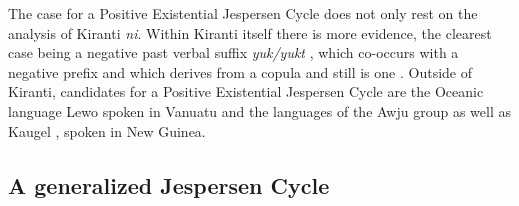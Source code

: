 ﻿\documentclass[output=paper,draft,draftmode,colorlinks,citecolor=brown]{langscibook}
\begin{document}
The case for a Positive Existential Jespersen Cycle does not only rest on
the analysis of Kiranti \textit{ni}. Within Kiranti itself there is more
evidence, the clearest case being a negative past verbal suffix
\textit{yuk/yukt} \parencite[163]{Doornenbal2009}, which co-occurs with a
negative prefix and which derives from a copula \parencite[276]{Doornenbal2009}
and still is one \parencite[119]{Doornenbal2009}. Outside of Kiranti, candidates
for a Positive Existential Jespersen Cycle are the Oceanic language Lewo
spoken in Vanuatu \parencites[425--426]{Early1994a}[79--80]{Early1994b} and the
languages of the Awju group \parencite[127--140]{Wester2014} as well as Kaugel
\parencite[152--153]{Head1976}, spoken in New Guinea.

\subsection{A generalized Jespersen Cycle}\label{sec:int-4.4}
\end{document}
